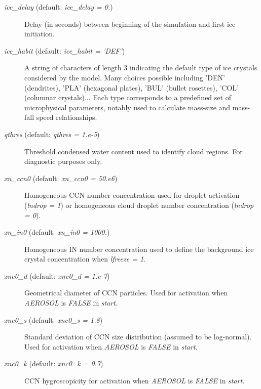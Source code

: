 \documentclass[12pt,A4,french]{article}
\begin{document}
\begin{description}
\item[{\it ice\_delay} (default: {\it ice\_delay = 0.})]

Delay (in seconds) between beginning of the simulation and first ice initiation.

\item[{\it ice\_habit} (default: {\it ice\_habit = 'DEF'})]

A string of characters of length 3 indicating the default type of ice crystals considered by the model. Many choices possible including 'DEN' (dendrites), 'PLA' (hexagonal plates), 'BUL' (bullet rosettes), 'COL' (columnar crystals)... Each type corresponds to a predefined set of microphysical parameters, notably used to calculate mass-size and mass-fall speed relationships.

\item[{\it qthres} (default: {\it qthres = 1.e-5})]

Threshold condensed water content used to identify cloud regions. For diagnostic purposes only.

\item[{\it xn\_ccn0} (default: {\it xn\_ccn0 = 50.e6})]

Homogeneous CCN number concentration used for droplet activation ({\it lndrop = 1}) or homogeneous cloud droplet number concentration ({\it lndrop = 0}).

\item[{\it xn\_in0} (default: {\it xn\_in0 = 1000.})]

Homogeneous IN number concentration used to define the background ice crystal concentration when {\it lfreeze = 1}.

\item[{\it xnc0\_d} (default: {\it xnc0\_d = 1.e-7})]

Geometrical diameter of CCN particles. Used for activation when {\it AEROSOL} is {\it FALSE} in {\it start}.

\item[{\it xnc0\_s} (default: {\it xnc0\_s = 1.8})]

Standard deviation of CCN size distribution (assumed to be log-normal). Used for activation when {\it AEROSOL} is {\it FALSE} in {\it start}.

\item[{\it xnc0\_k} (default: {\it xnc0\_k = 0.7})]

CCN hygroscopicity for activation when {\it AEROSOL} is {\it FALSE} in {\it start}.

\end{description}
\end{document}
